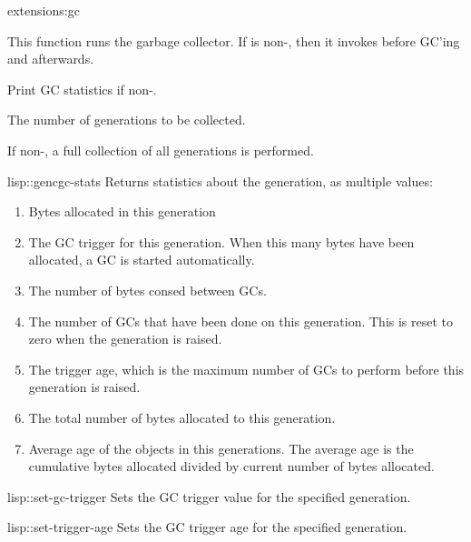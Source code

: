 \begin{defun}[-gencgc]{extensions:}{gc}{}
  
  This function runs the garbage collector.  If
   is non-\nil, then it invokes
   before GC'ing and
   afterwards.

  \begin{Lentry}
  \item[\code{verbose}] Print GC statistics if non-.
  \item[\code{gen}] The number of generations to be collected.
  \item[\code{full}] If non-, a full collection of all
    generations is performed.
  \end{Lentry}
\end{defun}

\begin{defun}{lisp::}{gencgc-stats}{}
  Returns statistics about the generation, as multiple values:
  \begin{enumerate}
  \item Bytes allocated in this generation
  \item The GC trigger for this generation.  When this many bytes have
    been allocated, a GC is started automatically.
  \item The number of bytes consed between GCs.
  \item The number of GCs that have been done on this generation.
    This is reset to zero when the generation is raised.
  \item The trigger age, which is the maximum number of GCs to perform
    before this generation is raised.
  \item The total number of bytes allocated to this generation.
  \item Average age of the objects in this generations.  The average
    age is the cumulative bytes allocated divided by current number of
    bytes allocated.
  \end{enumerate}
\end{defun}

\begin{defun}{lisp::}{set-gc-trigger}{}
  Sets the GC trigger value for the specified generation.
\end{defun}

\begin{defun}{lisp::}{set-trigger-age}{}
  Sets the GC trigger age for the specified generation.
\end{defun}

